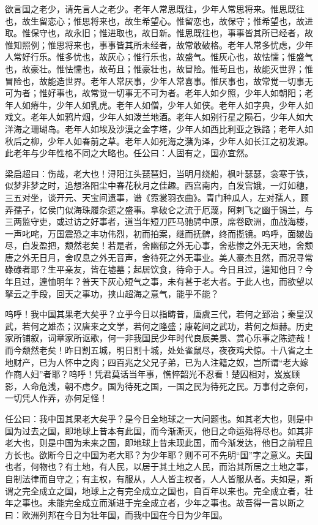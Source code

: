 \documentclass[UTF8,titlepage,oneside]{ctexbook}
\begin{document}
欲言国之老少，请先言人之老少。老年人常思既往，少年人常思将来。惟思既往也，故生留恋心；惟思将来也，故生希望心。惟留恋也，故保守；惟希望也，故进取。惟保守也，故永旧；惟进取也，故日新。惟思既往也，事事皆其所已经者，故惟知照例；惟思将来也，事事皆其所未经者，故常敢破格。老年人常多忧虑，少年人常好行乐。惟多忧也，故灰心；惟行乐也，故盛气。惟灰心也，故怯懦；惟盛气也，故豪壮。惟怯懦也，故苟且；惟豪壮也，故冒险。惟苟且也，故能灭世界；惟冒险也，故能造世界。老年人常厌事，少年人常喜事。惟厌事也，故常觉一切事无可为者；惟好事也，故常觉一切事无不可为者。老年人如夕照，少年人如朝阳；老年人如瘠牛，少年人如乳虎。老年人如僧，少年人如侠。老年人如字典，少年人如戏文。老年人如鸦片烟，少年人如泼兰地酒。老年人如别行星之陨石，少年人如大洋海之珊瑚岛。老年人如埃及沙漠之金字塔，少年人如西比利亚之铁路；老年人如秋后之柳，少年人如春前之草。老年人如死海之潴为泽，少年人如长江之初发源。此老年与少年性格不同之大略也。任公曰：人固有之，国亦宜然。

梁启超曰：伤哉，老大也！浔阳江头琵琶妇，当明月绕船，枫叶瑟瑟，衾寒于铁，似梦非梦之时，追想洛阳尘中春花秋月之佳趣。西宫南内，白发宫娥，一灯如穗，三五对坐，谈开元、天宝间遗事，谱《霓裳羽衣曲》。青门种瓜人，左对孺人，顾弄孺子，忆侯门似海珠履杂遝之盛事。拿破仑之流于厄蔑，阿剌飞之幽于锡兰，与三两监守吏，或过访之好事者，道当年短刀匹马驰骋中原，席卷欧洲，血战海楼，一声叱咤，万国震恐之丰功伟烈，初而拍案，继而抚髀，终而揽镜。呜呼，面皴齿尽，白发盈把，颓然老矣！若是者，舍幽郁之外无心事，舍悲惨之外无天地，舍颓唐之外无日月，舍叹息之外无音声，舍待死之外无事业。美人豪杰且然，而况寻常碌碌者耶？生平亲友，皆在墟墓；起居饮食，待命于人。今日且过，遑知他日？今年且过，遑恤明年？普天下灰心短气之事，未有甚于老大者。于此人也，而欲望以拏云之手段，回天之事功，挟山超海之意气，能乎不能？

呜呼！我中国其果老大矣乎？立乎今日以指畴昔，唐虞三代，若何之郅治；秦皇汉武，若何之雄杰；汉唐来之文学，若何之隆盛；康乾间之武功，若何之烜赫。历史家所铺叙，词章家所讴歌，何一非我国民少年时代良辰美景、赏心乐事之陈迹哉！而今颓然老矣！昨日割五城，明日割十城，处处雀鼠尽，夜夜鸡犬惊。十八省之土地财产，已为人怀中之肉；四百兆之父兄子弟，已为人注籍之奴，岂所谓“老大嫁作商人妇”者耶？呜呼！凭君莫话当年事，憔悴韶光不忍看！楚囚相对，岌岌顾影，人命危浅，朝不虑夕。国为待死之国，一国之民为待死之民。万事付之奈何，一切凭人作弄，亦何足怪！

任公曰：我中国其果老大矣乎？是今日全地球之一大问题也。如其老大也，则是中国为过去之国，即地球上昔本有此国，而今渐澌灭，他日之命运殆将尽也。如其非老大也，则是中国为未来之国，即地球上昔未现此国，而今渐发达，他日之前程且方长也。欲断今日之中国为老大耶？为少年耶？则不可不先明“国”字之意义。夫国也者，何物也？有土地，有人民，以居于其土地之人民，而治其所居之土地之事，自制法律而自守之；有主权，有服从，人人皆主权者，人人皆服从者。夫如是，斯谓之完全成立之国，地球上之有完全成立之国也，自百年以来也。完全成立者，壮年之事也。未能完全成立而渐进于完全成立者，少年之事也。故吾得一言以断之曰：欧洲列邦在今日为壮年国，而我中国在今日为少年国。
\end{document}
